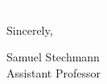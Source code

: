 \documentclass[11pt]{article}
\begin{document}
\vspace{24pt}
\noindent
\begin{minipage}{0.99\textwidth}
\begin{minipage}{0.69\textwidth}
\textcolor{white}{.}
\end{minipage}
\begin{minipage}{0.29\textwidth}
Sincerely, 

\vspace{36pt}
Samuel Stechmann \\
Assistant Professor
\end{minipage}
\end{minipage}

\end{document}
